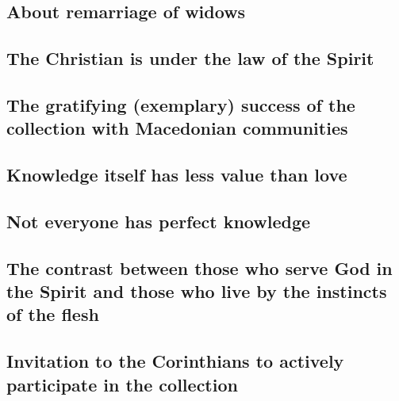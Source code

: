 \hypertarget{about-remarriage-of-widows}{%
\subsection{About remarriage of
widows}\label{about-remarriage-of-widows}}

\hypertarget{the-christian-is-under-the-law-of-the-spirit}{%
\subsection{The Christian is under the law of the
Spirit}\label{the-christian-is-under-the-law-of-the-spirit}}

\hypertarget{the-gratifying-exemplary-success-of-the-collection-with-macedonian-communities}{%
\subsection{The gratifying (exemplary) success of the collection with
Macedonian
communities}\label{the-gratifying-exemplary-success-of-the-collection-with-macedonian-communities}}

\hypertarget{knowledge-itself-has-less-value-than-love}{%
\subsection{Knowledge itself has less value than
love}\label{knowledge-itself-has-less-value-than-love}}

\hypertarget{not-everyone-has-perfect-knowledge}{%
\subsection{Not everyone has perfect
knowledge}\label{not-everyone-has-perfect-knowledge}}

\hypertarget{the-contrast-between-those-who-serve-god-in-the-spirit-and-those-who-live-by-the-instincts-of-the-flesh}{%
\subsection{The contrast between those who serve God in the Spirit and
those who live by the instincts of the
flesh}\label{the-contrast-between-those-who-serve-god-in-the-spirit-and-those-who-live-by-the-instincts-of-the-flesh}}

\hypertarget{invitation-to-the-corinthians-to-actively-participate-in-the-collection}{%
\subsection{Invitation to the Corinthians to actively participate in the
collection}\label{invitation-to-the-corinthians-to-actively-participate-in-the-collection}}

